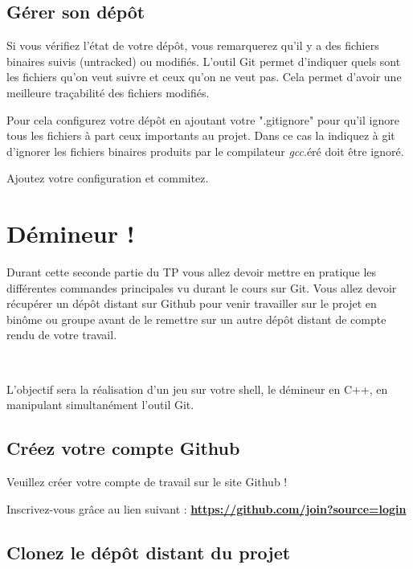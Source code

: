 \subsection{Gérer son dépôt}
Si vous vérifiez l'état de votre dépôt, vous remarquerez qu'il y a des fichiers binaires suivis (untracked) ou modifiés. L'outil Git permet d'indiquer quels sont les fichiers qu'on veut suivre et ceux qu'on ne veut pas. Cela permet d'avoir une meilleure traçabilité des fichiers modifiés.
\medskip

Pour cela configurez votre dépôt en ajoutant votre ".gitignore" pour qu'il ignore tous les fichiers à part ceux importants au projet. Dans ce cas la indiquez à git d'ignorer les fichiers binaires produits par le compilateur \textit{gcc}.éré doit être ignoré.

\medskip

\noindent Ajoutez votre configuration et commitez.

\newpage 

\section{Démineur !} 

Durant cette seconde partie du TP vous allez devoir mettre en pratique les différentes commandes principales vu durant le cours sur Git. Vous allez devoir récupérer un dépôt distant sur Github pour venir travailler sur le projet en binôme ou groupe avant de le remettre sur un autre dépôt distant de compte rendu de votre travail.

~

\noindent L'objectif sera la réalisation d'un jeu sur votre shell, le démineur en C++, en manipulant simultanément l'outil Git.

\subsection{Créez votre compte Github}

\noindent Veuillez créer votre compte de travail sur le site Github !

\medskip

\noindent Inscrivez-vous grâce au lien suivant : \textbf{\href{https://github.com/join?source=login/}{https://github.com/join?source=login}}

\subsection{Clonez le dépôt distant du projet}

